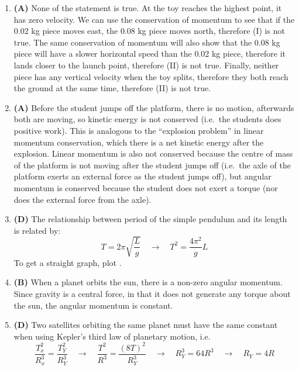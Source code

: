 \documentclass{../oss-handout}
\begin{document}
\begin{enumerate}[leftmargin=17pt]
\item\textbf{(A)} None of the statement is true. At the toy reaches the highest
  point, it has zero velocity. We can use the conservation of momentum to
  see that if the 0.02 kg piece moves east, the 0.08 kg piece moves north,
  therefore (I) is not true. The same conservation of momentum will also show
  that the 0.08 kg piece will have a slower horizontal speed than the 0.02 kg
  piece, therefore it lands closer to the launch point, therefore (II) is not
  true. Finally, neither piece has any vertical velocity when the toy splits,
  therefore they both reach the ground at the same time, therefore (II) is not
  true.

\item\textbf{(A)} Before the student jumps off the platform, there is no
  motion, afterwards both are moving, so kinetic energy is not conserved (i.e.\
  the students does positive work). This is analogous to the ``explosion
  problem'' in linear momentum conservation, which there is a net kinetic
  energy after the explosion. Linear momentum is also not conserved
  because the centre of mass of the platform is not moving after the student
  jumps off (i.e.\ the axle of the platform exerts an external force as the
  student jumps off), but angular momentum is conserved because the student
  does not exert a torque (nor does the external force from the axle).
  
\item\textbf{(D)} The relationship between period of the simple pendulum and its
  length is related by:
  \begin{displaymath}
    T=2\pi\sqrt{\frac Lg}\quad\longrightarrow\quad
    T^2=\frac{4\pi^2}gL
  \end{displaymath}
  To get a straight graph, plot .

\item\textbf{(B)} When a planet orbits the sun, there is a non-zero angular
  momentum. Since gravity is a central force, in that it does not generate any
  torque about the sun, the angular momentum is constant.

\item\textbf{(D)} Two satellites orbiting the same planet must have the same
  constant when using Kepler's third law of planetary motion, i.e.
  \begin{displaymath}
    \frac{T_x^2}{R_x^3}=\frac{T_Y^2}{R_Y^3}\quad\longrightarrow\quad
    \frac{T^2}{R^3}=\frac{(8T)^2}{R_Y^3}\quad\longrightarrow\quad
    R_Y^3=64R^3\quad\longrightarrow\quad R_Y=\boxed{4R}
  \end{displaymath}


\end{enumerate}
\end{document}
